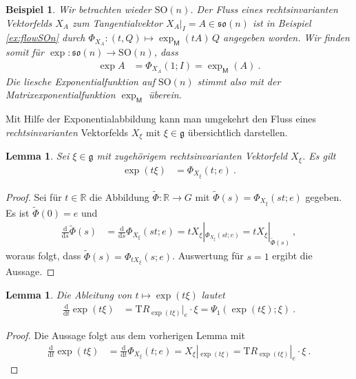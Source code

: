 \documentclass[10pt,a4paper]{article}
\theoremstyle{mytheorem}
\newtheorem{lemma}[theorem]{Lemma}
\theoremstyle{mydefinition}
\newtheorem{example}[theorem]{Beispiel}
\newcommand{\dt}{\mathrm{d}}
\newcommand{\Tt}{\mathrm{T}}
\newcommand{\SO}{\mathrm{SO}}
\newcommand{\fso}{\mathfrak{so}}
\newcommand{\fg}{\mathfrak{g}}
\begin{document}
\begin{example}
Wir betrachten wieder $\SO(n)$.
Der Fluss eines rechtsinvarianten Vektorfelds $X_A$ zum Tangentialvektor $X_A|_I=A\in\fso(n)$ ist in Beispiel \ref{ex:flowSOn} durch $\Phi_{X_A}:(t,Q)\mapsto\exp_\mathsf{M}(tA)\,Q$ angegeben worden.
Wir finden somit für $\exp:\fso(n)\rightarrow\SO(n)$, dass
\begin{align*}
	\exp A &= \Phi_{X_A}(1; I) = \exp_\mathsf{M}(A)
	\ .
\end{align*}
Die liesche Exponentialfunktion auf $\SO(n)$ stimmt also mit der Matrixexponentialfunktion $\exp_\mathsf{M}$ überein.
\end{example}

Mit Hilfe der Exponentialabbildung kann man umgekehrt den Fluss eines \emph{rechtsinvarianten} Vektorfelds $X_\xi$ mit $\xi\in\mathfrak{g}$ übersichtlich darstellen.

\begin{lemma}
Sei $\xi\in\fg$ mit zugehörigem rechtsinvarianten Vektorfeld $X_\xi$.
Es gilt
\begin{align*}
	\exp(t\xi) &= \Phi_{X_\xi}(t; e)
	\ .
\end{align*}
\end{lemma}
\begin{proof}
Sei für $t\in\mathbb{R}$ die Abbildung $\tilde{\Phi}:\mathbb{R}\rightarrow G$ mit $\tilde{\Phi}(s)=\Phi_{X_\xi}(st; e)$ gegeben.
Es ist $\tilde{\Phi}(0)=e$ und
\begin{align*}
	\frac{\dt}{\dt s}	
	\tilde{\Phi}(s)
	&=
	\frac{\dt}{\dt s}
	\Phi_{X_\xi}(st; e)
	= tX_\xi|_{\Phi_{X_\xi}(st; e)} = tX_\xi|_{\tilde{\Phi}(s)}
	\ ,
\end{align*}
woraus folgt, dass $\tilde{\Phi}(s)=\Phi_{tX_\xi}(s; e)$.
Auswertung für $s=1$ ergibt die Aussage.
\end{proof}

\begin{lemma}
Die Ableitung von $t\mapsto\exp(t\xi)$ lautet
\begin{align*}
	\frac{\dt}{\dt t}\exp(t\xi)
	&=
	\Tt R_{\exp(t\xi)}|_e\cdot\xi
	=
	\Psi_1(\exp(t\xi); \xi)
	\ .
\end{align*}
\end{lemma}
\begin{proof}
Die Aussage folgt aus dem vorherigen Lemma mit
\begin{align*}
	\frac{\dt}{\dt t}\exp(t\xi)
	&= 
	\frac{\dt}{\dt t}
	\Phi_{X_\xi}(t;e)
	= X_\xi|_{\exp(t\xi)}
	= \Tt R_{\exp(t\xi)}|_e\cdot\xi
	\ .
\end{align*}
\end{proof}
\end{document}
